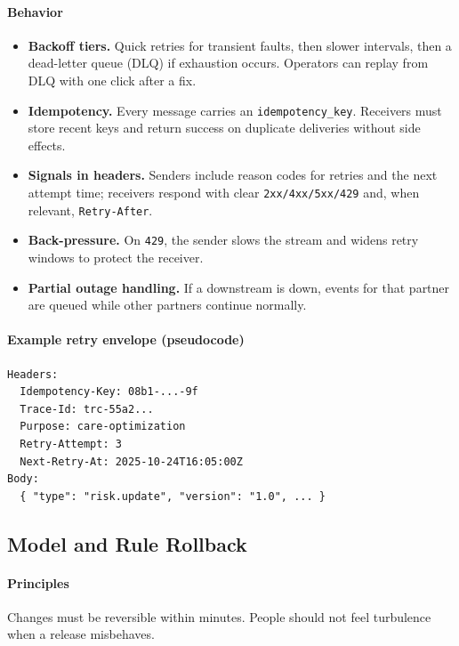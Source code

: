 \documentclass[12pt]{article}
\begin{document}
\paragraph{Behavior}
\begin{itemize}[leftmargin=*]
  \item \textbf{Backoff tiers.} Quick retries for transient faults, then slower intervals, then a dead-letter queue (DLQ) if exhaustion occurs. Operators can replay from DLQ with one click after a fix.
  \item \textbf{Idempotency.} Every message carries an \texttt{idempotency\_key}. Receivers must store recent keys and return success on duplicate deliveries without side effects.
  \item \textbf{Signals in headers.} Senders include reason codes for retries and the next attempt time; receivers respond with clear \texttt{2xx/4xx/5xx/429} and, when relevant, \texttt{Retry-After}.
  \item \textbf{Back-pressure.} On \texttt{429}, the sender slows the stream and widens retry windows to protect the receiver.
  \item \textbf{Partial outage handling.} If a downstream is down, events for that partner are queued while other partners continue normally.
\end{itemize}

\paragraph{Example retry envelope (pseudocode)}
\begin{verbatim}
Headers:
  Idempotency-Key: 08b1-...-9f
  Trace-Id: trc-55a2...
  Purpose: care-optimization
  Retry-Attempt: 3
  Next-Retry-At: 2025-10-24T16:05:00Z
Body:
  { "type": "risk.update", "version": "1.0", ... }
\end{verbatim}

\subsection*{Model and Rule Rollback}
\paragraph{Principles}
Changes must be reversible within minutes. People should not feel turbulence when a release misbehaves.
\end{document}
